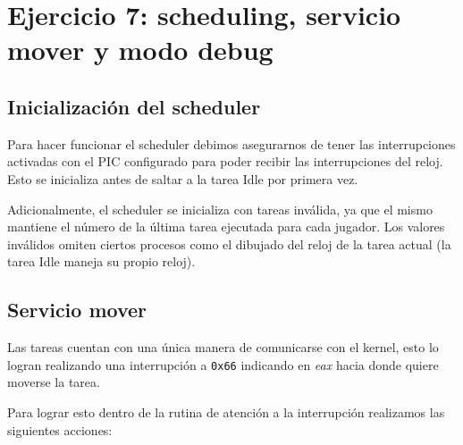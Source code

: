 \section{Ejercicio 7: scheduling, servicio mover y modo debug}
    
    \subsection{Inicialización del scheduler}

    Para hacer funcionar el scheduler debimos asegurarnos de tener las interrupciones activadas con el PIC configurado para poder recibir las interrupciones del reloj. Esto se inicializa antes de saltar a la tarea Idle por primera vez.

    Adicionalmente, el scheduler se inicializa con tareas inválida, ya que el mismo mantiene el número de la última tarea ejecutada para cada jugador. Los valores inválidos omiten ciertos procesos como el dibujado del reloj de la tarea actual (la tarea Idle maneja su propio reloj).

	\subsection{Servicio mover}
	Las tareas cuentan con una única manera de comunicarse con el kernel, esto lo logran realizando una interrupción a \texttt{0x66} indicando en \textit{eax} hacia donde quiere moverse la tarea.

	Para lograr esto dentro de la rutina de atención a la interrupción realizamos las siguientes acciones:


